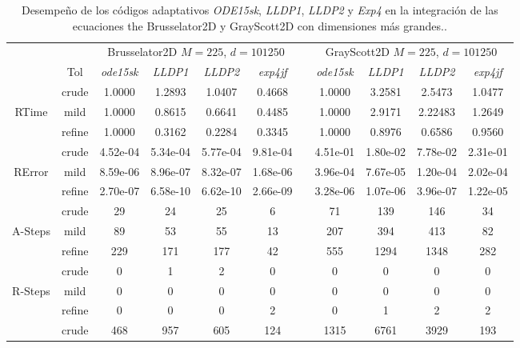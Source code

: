 \newpage

\begin{table}
    \caption{Desempeño de los códigos adaptativos \emph{ODE15sk}, \emph{LLDP1}, \emph{LLDP2} y \emph{Exp4} en la integración de las ecuaciones the Brusselator2D y GrayScott2D con dimensiones más grandes..}
    \label{tab:Largerbruss2DGrayScott}
    \begin{adjustbox}{width=0.98\columnwidth,center}
        \begin{tabular}{ccccccccccc}
            \hline
            &  & \multicolumn{4}{c}{Brusselator2D $M=225$, $d=101250$} &  & \multicolumn{4}{c}{GrayScott2D $M=225$, $d=101250$} \\
            \cline{3-6}\cline{8-11} & Tol & \emph{ode15sk} & \emph{LLDP1} & \emph{LLDP2} & \emph{exp4jf} &  & \emph{ode15sk} & \emph{LLDP1} & \emph{LLDP2} & \emph{exp4jf} \\
            \hline
            & crude & 1.0000 & 1.2893 & 1.0407 & 0.4668 &  & 1.0000 & 3.2581 & 2.5473 & 1.0477 \\
            RTime & mild & 1.0000 & 0.8615 & 0.6641 & 0.4485 &  & 1.0000 & 2.9171 & 2.22483 & 1.2649 \\
            & refine & 1.0000 & 0.3162 & 0.2284 & 0.3345 &  & 1.0000 & 0.8976 & 0.6586 & 0.9560 \\
            \hline
            & crude & 4.52e-04 & 5.34e-04 & 5.77e-04 & 9.81e-04 &  & 4.51e-01 & 1.80e-02 & 7.78e-02 & 2.31e-01 \\
            RError & mild & 8.59e-06 & 8.96e-07 & 8.32e-07 & 1.68e-06 &  & 3.96e-04 & 7.67e-05 & 1.20e-04 & 2.02e-04 \\
            & refine & 2.70e-07 & 6.58e-10 & 6.62e-10 & 2.66e-09 &  & 3.28e-06 & 1.07e-06 & 3.96e-07 & 1.22e-05 \\
            \hline
            & crude & 29 & 24 & 25 & 6 &  & 71 & 139 & 146 & 34 \\
            A-Steps & mild & 89 & 53 & 55 & 13 &  & 207 & 394 & 413 & 82 \\
            & refine & 229 & 171 & 177 & 42 &  & 555 & 1294 & 1348 & 282 \\
            \hline
            & crude & 0 & 1 & 2 & 0 &  & 0 & 0 & 0 & 0 \\
            R-Steps & mild & 0 & 0 & 0 & 0 &  & 0 & 0 & 0 & 0 \\
            & refine & 0 & 0 & 0 & 2 &  & 0 & 1 & 2 & 2 \\
            \hline
            & crude & 468 & 957 & 605 & 124 &  & 1315 & 6761 & 3929 & 193 \\

\end{tabular}
\end{adjustbox}
\end{table}
